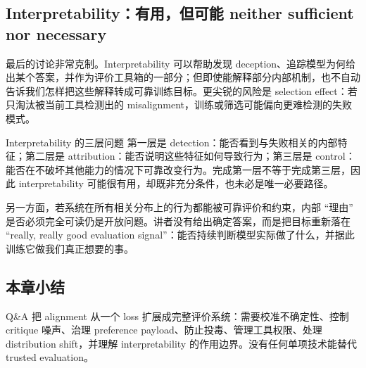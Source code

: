 \subsection{Interpretability：有用，但可能 neither sufficient nor necessary}

最后的讨论非常克制。Interpretability 可以帮助发现 deception、追踪模型为何给出某个答案，并作为评价工具箱的一部分；但即使能解释部分内部机制，也不自动告诉我们怎样把这些解释转成可靠训练目标。更尖锐的风险是 selection effect：若只淘汰被当前工具检测出的 misalignment，训练或筛选可能偏向更难检测的失败模式。

\begin{importantbox}{Interpretability 的三层问题}
第一层是 detection：能否看到与失败相关的内部特征；第二层是 attribution：能否说明这些特征如何导致行为；第三层是 control：能否在不破坏其他能力的情况下可靠改变行为。完成第一层不等于完成第三层，因此 interpretability 可能很有用，却既非充分条件，也未必是唯一必要路径。
\end{importantbox}

另一方面，若系统在所有相关分布上的行为都能被可靠评价和约束，内部 ``理由'' 是否必须完全可读仍是开放问题。讲者没有给出确定答案，而是把目标重新落在 ``really, really good evaluation signal''：能否持续判断模型实际做了什么，并据此训练它做我们真正想要的事。

\subsection{本章小结}

Q\&A 把 alignment 从一个 loss 扩展成完整评价系统：需要校准不确定性、控制 critique 噪声、治理 preference payload、防止投毒、管理工具权限、处理 distribution shift，并理解 interpretability 的作用边界。没有任何单项技术能替代 trusted evaluation。

